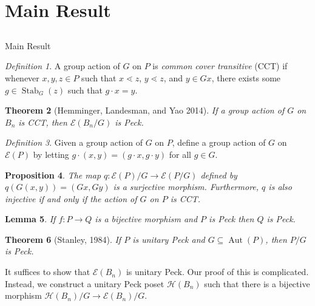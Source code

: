 \documentclass{beamer}
\newtheorem{thm}{Theorem}
\newtheorem{lem}[thm]{Lemma}
\newtheorem{prop}[thm]{Proposition}
\theoremstyle{remark}
\newtheorem{defn}[thm]{Definition}
\def\Stab{\operatorname{Stab}}
\begin{document}

\section{Main Result}
\subsection{}

\begin{frame}{Main Result}
\begin{defn}
A group action of $G$ on $P$ is \textit{common cover transitive} (CCT) if whenever $x,y,z\in P$ such that $x\lessdot z$, $y\lessdot z$, and $y\in Gx$, there exists some $g\in \Stab_G(z)$ such that $g\cdot x = y$.
\end{defn}

\begin{thm}[Hemminger, Landesman, and Yao 2014]
If a group action of $G$ on $B_n$ is CCT, then $\mathcal{E}(B_n/G)$ is Peck.
\end{thm}
\end{frame}








\begin{frame}
\begin{defn}
Given a group action of $G$ on $P$, define a group action of $G$ on $\mathcal{E}(P)$ by letting $g\cdot (x,y) = (g\cdot x,g\cdot y)$ for all $g\in G$.
\end{defn}
\pause
\begin{prop}
The map $q\colon \mathcal{E}(P)/G\rightarrow \mathcal{E}(P/G)$ defined by $q(G(x,y)) = (Gx,Gy)$ is a surjective morphism.  Furthermore, $q$ is also injective if and only if the action of $G$ on $P$ is CCT.
\end{prop}

\begin{lem}
If $f:P\rightarrow Q$ is a bijective morphism and $P$ is Peck then $Q$ is Peck.
\end{lem}
\end{frame}









\begin{frame}
\begin{thm}[Stanley, 1984]
If $P$ is unitary Peck and $G\subseteq\operatorname{Aut}(P)$, then $P/G$ is Peck.
\end{thm}
It suffices to show that $\mathcal{E}(B_n)$ is unitary Peck. Our proof of this is complicated. Instead, we construct a unitary Peck poset $\mathcal{H}(B_n)$ such that there is a bijective morphism $\mathcal{H}(B_n)/G\rightarrow \mathcal{E}(B_n)/G$.

\end{frame}
\end{document}

